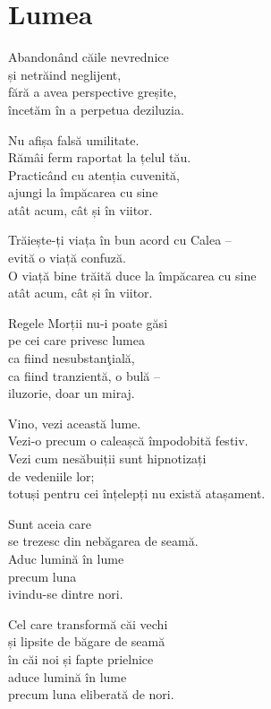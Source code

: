 
\chapter{Lumea}


Abandonând căile nevrednice\\
și netrăind neglijent,\\
fără a avea perspective greșite,\\
încetăm în a perpetua deziluzia.


Nu afișa falsă umilitate.\\
Rămâi ferm raportat la țelul tău.\\
Practicând cu atenția cuvenită,\\
ajungi la împăcarea cu sine\\
atât acum, cât și în viitor.


Trăiește-ți viața în bun acord cu Calea –\\
evită o viață confuză.\\
O viață bine trăită duce la împăcarea cu sine\\
atât acum, cât și în viitor.


Regele Morții nu-i poate găsi\\
pe cei care privesc lumea\\
ca fiind nesubstanţială,\\
ca fiind tranzientă, o bulă –\\
iluzorie, doar un miraj.


Vino, vezi această lume.\\
Vezi-o precum o caleașcă împodobită festiv.\\
Vezi cum nesăbuiții sunt hipnotizați\\
de vedeniile lor;\\
totuși pentru cei înțelepți nu există atașament.


Sunt aceia care\\
se trezesc din nebăgarea de seamă.\\
Aduc lumină în lume\\
precum luna\\
ivindu-se dintre nori.


Cel care transformă căi vechi\\
și lipsite de băgare de seamă\\
în căi noi și fapte prielnice\\
aduce lumină în lume\\
precum luna eliberată de nori.


